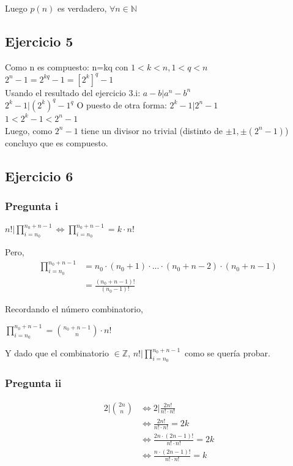 Luego $p(n)$ es verdadero, $ \forall n \in \mathbb{N} $

\subsection{Ejercicio 5}
Como n es compuesto: n=kq con $1<k<n, 1<q<n$ \\
$2^{n}-1=2^{kq}-1=[2^{k}]^{q}-1$ \\
Usando el resultado del ejercicio 3.i: $a-b | a^n-b^n$ \\
$2^k-1 | (2^{k})^{q}-1^q$ O puesto de otra forma: $2^k-1 | 2^n-1$ \\
$1 < 2^k-1 < 2^n-1$ \\
Luego, como $2^{n}-1$ tiene un divisor no trivial (distinto de $\pm1, \pm(2^{n}-1)$) concluyo que es compuesto.

\subsection{Ejercicio 6}
\subsubsection{Pregunta i}
$ n! | \prod_{i = n_0}^{n_0 + n - 1} \iff \prod_{i = n_0}^{n_0 + n - 1} = k\cdot n!$

Pero,
\begin{align*}
    \prod_{i = n_0}^{n_0 + n - 1} &= n_0 \cdot (n_0 +1) \cdot ... \cdot (n_0 + n - 2) \cdot (n_0 + n -1) \\
    &= \frac{(n_0+n-1)!}{(n_0-1)!}
\end{align*}

Recordando el número combinatorio, 

$ \prod_{i = n_0}^{n_0 + n - 1} = \binom{n_0+n-1}{n} \cdot n! $

Y dado que el combinatorio $ \in \mathbb{Z} $, $ n! | \prod_{i = n_0}^{n_0 + n - 1} $ como se quería probar.

\subsubsection{Pregunta ii}
\begin{align*}
    2 | \binom{2n}{n} &\iff 2|\frac{2n!}{n!\cdot n!} \\
    &\iff \frac{2n!}{n!\cdot n!} = 2k \\
    &\iff \frac{2n \cdot (2n-1)!}{n!\cdot n!} = 2k \\
    &\iff \frac{n \cdot (2n-1)!}{n!\cdot n!} = k \\
\end{align*}

